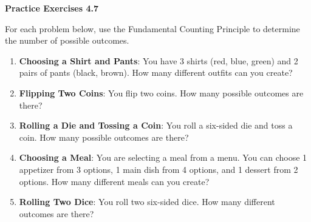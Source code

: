  \vspace{0.3ex}
\noindent\textbf{Practice Exercises 4.7}

\vspace{0.2ex}


For each problem below, use the Fundamental Counting Principle to determine the number of possible outcomes.
\begin{enumerate}[noitemsep, label = \color{blue}\arabic*. ]
    \item \textbf{Choosing a Shirt and Pants}: You have 3 shirts (red, blue, green) and 2 pairs of pants (black, brown). How many different outfits can you create?

    \item \textbf{Flipping Two Coins}: You flip two coins. How many possible outcomes are there?

    \item \textbf{Rolling a Die and Tossing a Coin}: You roll a six-sided die and toss a coin. How many possible outcomes are there?

    \item \textbf{Choosing a Meal}: You are selecting a meal from a menu. You can choose 1 appetizer from 3 options, 1 main dish from 4 options, and 1 dessert from 2 options. How many different meals can you create?

    \item \textbf{Rolling Two Dice}: You roll two six-sided dice. How many different outcomes are there?





\end{enumerate}
